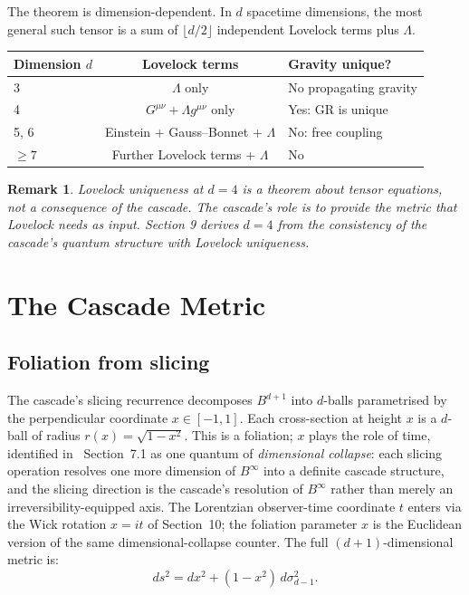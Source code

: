 \documentclass[12pt,a4paper]{article}
\newtheorem*{remark}{Remark}
\begin{document}
The theorem is dimension-dependent. In $d$ spacetime dimensions, the most general
such tensor is a sum of $\lfloor d/2 \rfloor$ independent Lovelock terms plus $\Lambda$.

\begin{center}
\begin{tabular}{lcl}
\hline
Dimension $d$ & Lovelock terms & Gravity unique? \\
\hline
3 & $\Lambda$ only & No propagating gravity \\
4 & $G^{\mu\nu} + \Lambda g^{\mu\nu}$ only & Yes: GR is unique \\
5, 6 & Einstein + Gauss--Bonnet + $\Lambda$ & No: free coupling \\
$\geq 7$ & Further Lovelock terms + $\Lambda$ & No \\
\hline
\end{tabular}
\end{center}

\begin{remark}
Lovelock uniqueness at $d = 4$ is a theorem about tensor equations, not a
consequence of the cascade. The cascade's role is to provide the metric that Lovelock needs
as input. Section 9 derives $d = 4$ from the consistency of the cascade's quantum structure
with Lovelock uniqueness.
\end{remark}

\section{The Cascade Metric}\label{sec:the-cascade-metric}

\subsection{Foliation from slicing}

The cascade's slicing recurrence decomposes $B^{d+1}$ into $d$-balls parametrised by the
perpendicular coordinate $x \in [-1, 1]$. Each cross-section at height $x$ is a $d$-ball of radius
$r(x) = \sqrt{1 - x^2}$. This is a foliation; $x$ plays the role of time, identified
in~\cite{part2} Section~7.1 as one quantum of \emph{dimensional collapse}: each
slicing operation resolves one more dimension of $B^\infty$ into a definite cascade
structure, and the slicing direction is the cascade's resolution of $B^\infty$ rather
than merely an irreversibility-equipped axis. The Lorentzian observer-time coordinate
$t$ enters via the Wick rotation $x = it$ of Section~10; the foliation parameter $x$
is the Euclidean version of the same dimensional-collapse counter. The full
$(d + 1)$-dimensional metric is:
\[
ds^2 = dx^2 + (1 - x^2)\,d\sigma_{d-1}^2.
\]
\end{document}
